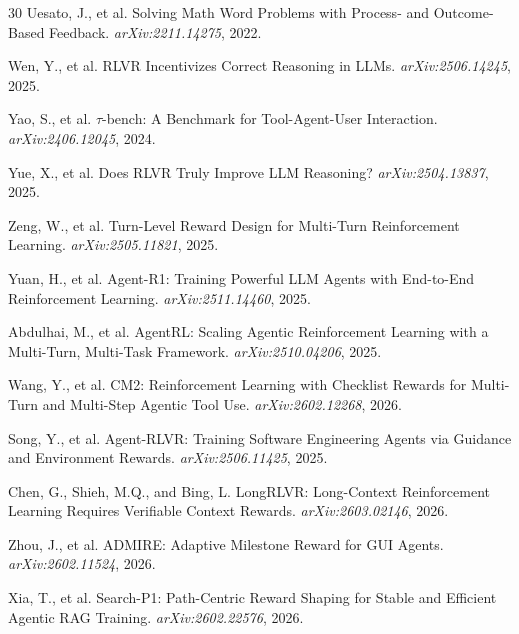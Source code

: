 \documentclass[11pt]{article}
\begin{document}
\begin{thebibliography}{30}
Uesato, J., et al.
\newblock Solving Math Word Problems with Process- and Outcome-Based Feedback.
\newblock \emph{arXiv:2211.14275}, 2022.

Wen, Y., et al.
\newblock RLVR Incentivizes Correct Reasoning in LLMs.
\newblock \emph{arXiv:2506.14245}, 2025.

Yao, S., et al.
\newblock $\tau$-bench: A Benchmark for Tool-Agent-User Interaction.
\newblock \emph{arXiv:2406.12045}, 2024.

Yue, X., et al.
\newblock Does RLVR Truly Improve LLM Reasoning?
\newblock \emph{arXiv:2504.13837}, 2025.

Zeng, W., et al.
\newblock Turn-Level Reward Design for Multi-Turn Reinforcement Learning.
\newblock \emph{arXiv:2505.11821}, 2025.

Yuan, H., et al.
\newblock Agent-R1: Training Powerful LLM Agents with End-to-End Reinforcement Learning.
\newblock \emph{arXiv:2511.14460}, 2025.

Abdulhai, M., et al.
\newblock AgentRL: Scaling Agentic Reinforcement Learning with a Multi-Turn, Multi-Task Framework.
\newblock \emph{arXiv:2510.04206}, 2025.

Wang, Y., et al.
\newblock CM2: Reinforcement Learning with Checklist Rewards for Multi-Turn and Multi-Step Agentic Tool Use.
\newblock \emph{arXiv:2602.12268}, 2026.

Song, Y., et al.
\newblock Agent-RLVR: Training Software Engineering Agents via Guidance and Environment Rewards.
\newblock \emph{arXiv:2506.11425}, 2025.

Chen, G., Shieh, M.Q., and Bing, L.
\newblock LongRLVR: Long-Context Reinforcement Learning Requires Verifiable Context Rewards.
\newblock \emph{arXiv:2603.02146}, 2026.

Zhou, J., et al.
\newblock ADMIRE: Adaptive Milestone Reward for GUI Agents.
\newblock \emph{arXiv:2602.11524}, 2026.

Xia, T., et al.
\newblock Search-P1: Path-Centric Reward Shaping for Stable and Efficient Agentic RAG Training.
\newblock \emph{arXiv:2602.22576}, 2026.


\end{thebibliography}
\end{document}
